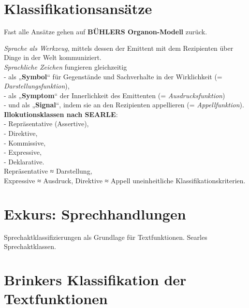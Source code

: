 \documentclass[
  letterpaper,
]{scrbook}
\begin{document}
\hypertarget{klassifikationsansuxe4tze}{%
\section{Klassifikationsansätze}\label{klassifikationsansuxe4tze}}

Fast alle Ansätze gehen auf \textbf{BÜHLERS Organon-Modell} zurück.

\emph{Sprache als Werkzeug}, mittels dessen der Emittent mit dem
Rezipienten über Dinge in der Welt kommuniziert.\\

\emph{Sprachliche Zeichen} fungieren gleichzeitig\\
- als „\textbf{Symbol}`` für Gegenstände und Sachverhalte in der
Wirklichkeit (= \emph{Darstellungsfunktion}),\\
- als „\textbf{Symptom}`` der Innerlichkeit des Emittenten (=
\emph{Ausdrucksfunktion})\\
- und als „\textbf{Signal}``, indem sie an den Rezipienten appellieren
(= \emph{Appellfunktion}).\\

\textbf{Illokutionsklassen nach SEARLE}:\\
- Repräsentative (Assertive),\\
- Direktive,\\
- Kommissive,\\
- Expressive,\\
- Deklarative.\\

Repräsentative ≈ Darstellung,\\
Expressive ≈ Ausdruck, Direktive ≈ Appell uneinheitliche
Klassifikationskriterien.\\

\hypertarget{exkurs-sprechhandlungen}{%
\section{Exkurs: Sprechhandlungen}\label{exkurs-sprechhandlungen}}

Sprechaktklassifizierungen als Grundlage für Textfunktionen. Searles
Sprechaktklassen.

\hypertarget{brinkers-klassifikation-der-textfunktionen}{%
\section{Brinkers Klassifikation der
Textfunktionen}\label{brinkers-klassifikation-der-textfunktionen}}
\end{document}
